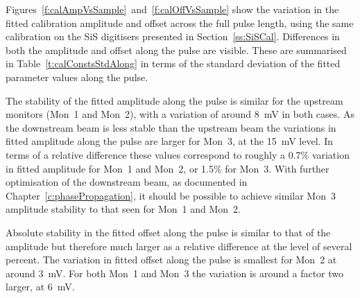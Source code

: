 Figures~\ref{f:calAmpVsSample}~and~\ref{f:calOffVsSample} show the variation in the fitted calibration amplitude and offset across the full pulse length, using the same calibration on the SiS digitisers presented in Section~\ref{ss:SiSCal}. Differences in both the amplitude and offset along the pulse are visible. These are summarised in Table~\ref{t:calConstsStdAlong} in terms of the standard deviation of the fitted parameter values along the pulse. 

The stability of the fitted amplitude along the pulse is similar for the upstream monitors (Mon~1 and Mon~2), with a variation of around 8~mV in both cases. As the downstream beam is less stable than the upstream beam the variations in fitted amplitude along the pulse are larger for Mon~3, at the 15~mV level. In terms of a relative difference these values correspond to roughly a 0.7\% variation in fitted amplitude for Mon~1 and Mon~2, or 1.5\% for Mon~3. With further optimisation of the downstream beam, as documented in Chapter~\ref{c:phasePropagation}, it should be possible to achieve similar Mon~3 amplitude stability to that seen for Mon~1 and Mon~2. 

Absolute stability in the fitted offset along the pulse is similar to that of the amplitude but therefore much larger as a relative difference at the level of several percent. The variation in fitted offset along the pulse is smallest for Mon~2 at around 3~mV. For both Mon~1 and Mon~3 the variation is around a factor two larger, at 6~mV.

